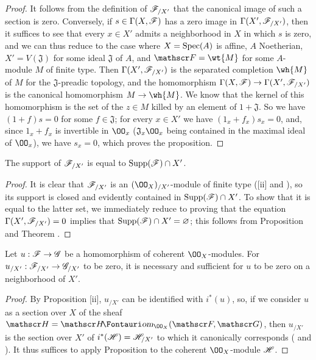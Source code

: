 \begin{proof}
\label{proof-1.10.8.11}
It follows from the definition of $\mathscr{F}_{/X'}$ that the canonical image of such a section is zero.
Conversely, if $s\in\Gamma(X,\mathscr{F})$ has a zero image in $\Gamma(X',\mathscr{F}_{/X'})$, then it suffices to see that every $x\in X'$ admits a neighborhood in $X$ in which $s$ is zero, and we can thus reduce to the case where $X=\operatorname{Spec}(A)$ is affine, $A$ Noetherian, $X'=V(\mathfrak{J})$ for some ideal $\mathfrak{J}$ of $A$, and $\sh{F}=\wt{M}$ for some $A$-module $M$ of finite type.
Then $\Gamma(X',\mathscr{F}_{/X'})$ is the separated completion $\wh{M}$ of $M$ for the $\mathfrak{J}$-preadic topology, and the homomorphism $\Gamma(X,\sh{F})\to\Gamma(X',\sh{F}_{/X'})$ is the canonical homomorphism $M\to\wh{M}$.
We know  that the kernel of this homomorphism is the set of the $z\in M$ killed by an element of $1+\mathfrak{J}$.
So we have $(1+f)s=0$ for some $f\in\mathfrak{J}$; for every $x\in X'$ we have $(1_x+f_x)s_x=0$, and, since $1_x+f_x$ is invertible in $\OO_x$ ($\mathfrak{J}_x\OO_x$ being contained in the maximal ideal of $\OO_x$), we have $s_x=0$, which proves the proposition.
\end{proof}

\begin{cor}[10.8.12]
\label{1.10.8.12}
The support of $\mathscr{F}_{/X'}$ is equal to $\operatorname{Supp}(\mathscr{F})\cap X'$.
\end{cor}

\begin{proof}
\label{proof-1.10.8.12}
It is clear that $\mathscr{F}_{/X'}$ is an $(\OO_X)_{/X'}$-module of finite type ([ii] and ),
so its support is closed  and evidently contained in $\operatorname{Supp}(\mathscr{F})\cap X'$.
To show that it is equal to the latter set, we immediately reduce to proving that the equation $\Gamma(X',\mathscr{F}_{/X'})=0$ implies that $\operatorname{Supp}(\mathscr{F})\cap X'=\varnothing$; this follows from Proposition  and Theorem .
\end{proof}

\begin{cor}[10.8.13]
\label{1.10.8.13}
Let $u:\sh{F}\to\sh{G}$ be a homomorphism of coherent $\OO_X$-modules.
For $u_{/X'}:\sh{F}_{/X'}\to\sh{G}_{/X'}$ to be zero, it is necessary and sufficient for $u$ to be zero on a neighborhood of $X'$.
\end{cor}

\begin{proof}
\label{proof-1.10.8.13}
By Proposition [ii], $u_{/X'}$ can be identified with $i^*(u)$, so, if we consider $u$ as a section over $X$ of the sheaf $\sh{H}=\shHom_{\OO_X}(\sh{F},\sh{G})$, then $u_{/X'}$ is the section over $X'$ of $i^*(\mathscr{H})=\mathscr{H}_{/X'}$ to which it canonically corresponds ( and ).
It thus suffices to apply Proposition  to the coherent $\OO_X$-module $\mathscr{H}$.
\end{proof}

